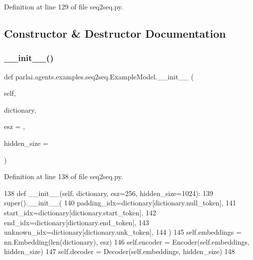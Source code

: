 Definition at line 129 of file seq2seq.\+py.



\subsection{Constructor \& Destructor Documentation}
\mbox{\label{classparlai_1_1agents_1_1examples_1_1seq2seq_1_1ExampleModel_a5288fbc80f0ba4e333c16febb9695a12}} 
\subsubsection{\texorpdfstring{\+\_\+\+\_\+init\+\_\+\+\_\+()}{\_\_init\_\_()}}
{\footnotesize\ttfamily def parlai.\+agents.\+examples.\+seq2seq.\+Example\+Model.\+\_\+\+\_\+init\+\_\+\+\_\+ (\begin{DoxyParamCaption}\item[{}]{self,  }\item[{}]{dictionary,  }\item[{}]{esz = {},  }\item[{}]{hidden\+\_\+size = {} }\end{DoxyParamCaption})}



Definition at line 138 of file seq2seq.\+py.


\begin{DoxyCode}
138     \textcolor{keyword}{def }\_\_init\_\_(self, dictionary, esz=256, hidden\_size=1024):
139         super().\_\_init\_\_(
140             padding\_idx=dictionary[dictionary.null\_token],
141             start\_idx=dictionary[dictionary.start\_token],
142             end\_idx=dictionary[dictionary.end\_token],
143             unknown\_idx=dictionary[dictionary.unk\_token],
144         )
145         self.embeddings = nn.Embedding(len(dictionary), esz)
146         self.encoder = Encoder(self.embeddings, hidden\_size)
147         self.decoder = Decoder(self.embeddings, hidden\_size)
148 
\end{DoxyCode}


